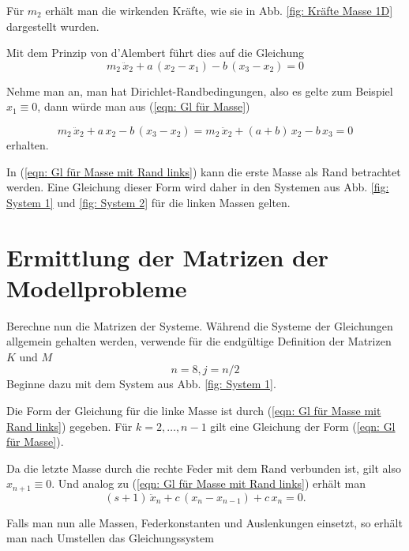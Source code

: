 \documentclass[a4paper,12pt]{report}
\newcommand{\1}{\mathds{1}}
\theoremstyle{plain} %
\theoremstyle{definition} %
\theoremstyle{remark}
\begin{document}
            Für $m_2$ erhält man die wirkenden Kräfte, wie sie in Abb. \ref{fig: Kräfte Masse 1D} dargestellt wurden.

            Mit dem Prinzip von d'Alembert führt dies auf die Gleichung
            \begin{equation}
                  \label{eqn: Gl für Masse}
                  m_2\,\ddot x_2 + a\,(x_2-x_1) - b\,(x_3-x_2) = 0
            \end{equation}

            Nehme man an, man hat Dirichlet-Randbedingungen, also es gelte zum Beispiel $x_1 \equiv 0$, dann würde man aus (\ref{eqn: Gl für Masse})

            \begin{equation}
                  \label{eqn: Gl für Masse mit Rand links}
                  m_2\,\ddot x_2 + a\,x_2 - b\,(x_3-x_2) = m_2\,\ddot x_2 + (a+b)\,x_2 -b\,x_3 = 0
            \end{equation}
            erhalten.

            In (\ref{eqn: Gl für Masse mit Rand links}) kann die erste Masse als Rand betrachtet werden.
            Eine Gleichung dieser Form wird daher in den Systemen aus Abb. \ref{fig: System 1} und \ref{fig: System 2} für die linken Massen gelten.

      \section{Ermittlung der Matrizen der Modellprobleme}
            Berechne nun die Matrizen der Systeme.
            Während die Systeme der Gleichungen allgemein gehalten werden, verwende für die endgültige Definition der Matrizen $K$ und $M$
            $$n=8, j=n/2$$ 
            Beginne dazu mit dem System aus Abb. \ref{fig: System 1}.

            Die Form der Gleichung für die linke Masse ist durch (\ref{eqn: Gl für Masse mit Rand links}) gegeben.
            Für $k=2,\dots, n-1$ gilt eine Gleichung der Form (\ref{eqn: Gl für Masse}).
            
            Da die letzte Masse durch die rechte Feder mit dem Rand verbunden ist, gilt also $x_{n+1} \equiv 0$.
            Und analog zu (\ref{eqn: Gl für Masse mit Rand links}) erhält man
            $$(s+1)\,\ddot x_n + c\,(x_n-x_{n-1}) + c\,x_n = 0.$$  

            Falls man nun alle Massen, Federkonstanten und Auslenkungen einsetzt, so erhält man nach Umstellen das Gleichungssystem
\end{document}
